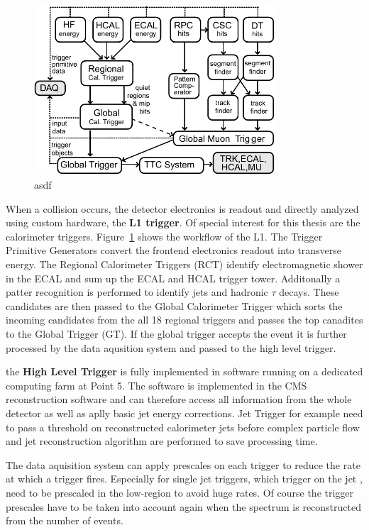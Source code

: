 \begin{figure}[htp]
    \centering
    \includegraphics[width=0.8\textwidth]{figures/cms_detector/cms_l1_trigger.pdf}\hfill
    \caption[The L1 Trigger of CMS]{asdf\cite{Sphicas:2002gg}}
    \label{fig:cms:l1_trigger}
\end{figure}

When a collision occurs, the detector electronics is readout and directly
analyzed using custom hardware, the \textbf{L1 trigger}. Of special interest for
this thesis are the calorimeter triggers. Figure~\ref{fig:cms:l1_trigger} shows
the workflow of the L1. The Trigger Primitive Generators convert the frontend
electronics readout into transverse energy. The Regional Calorimeter Triggers
(RCT) identify electromagnetic shower in the ECAL and sum up the ECAL and HCAL
trigger tower. Additonally a patter recognition is performed to identify jets
and hadronic $\tau$ decays. These candidates are then passed to the Global
Calorimeter Trigger which sorts the incoming candidates from the all 18 regional
triggers and passes the top canadites to the Global Trigger (GT). If the global
trigger accepts the event it is further processed by the data aqusition system
and passed to the high level trigger.

the \textbf{High Level Trigger} is fully implemented in software running on a
dedicated computing farm at Point 5. The software is implemented in the CMS
reconstruction software and can therefore access all information from the whole
detector as well as aplly basic jet energy corrections. Jet Trigger for example
need to pass a \pt threshold on reconstructed calorimeter jets before complex
particle flow and jet reconstruction algorithm are performed to save processing
time.

The data aquisition system can apply prescales on each trigger to reduce the
rate at which a trigger fires. Especially for single jet triggers, which
trigger on the jet \pt, need to be prescaled in the low-\pt region to avoid huge
rates. Of course the trigger prescales have to be taken into account again when
the spectrum is reconstructed from the number of events.

